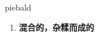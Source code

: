 
\begin{frame}
{\huge piebald}
\begin{center}
\begin{enumerate}\Large
  \item \textbf{混合的，杂糅而成的}
\end{enumerate}
\end{center}
\end{frame}
